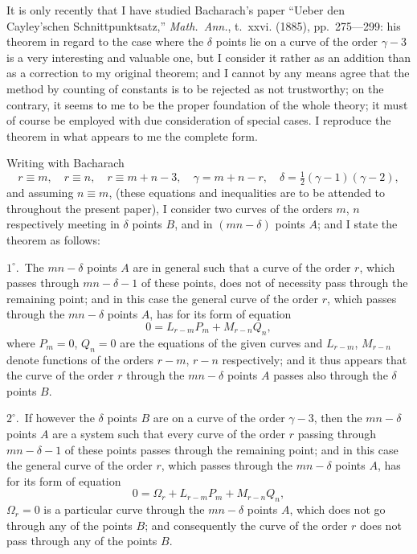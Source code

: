\documentclass[12pt,a4paper]{article}
\theoremstyle{definition}
\begin{document}
It is only recently that I have studied Bacharach's paper ``Ueber den Cayley'schen
Schnittpunktsatz,'' \textit{Math.\ Ann.}, t.~xxvi. (1885), pp.~275---299: his theorem in regard
to the case where the $\delta$ points lie on a curve of the order $\gamma-3$ is a very
interesting and valuable one, but I consider it rather as an addition than as a
correction to my original theorem; and I cannot by any means agree that the
method by counting of constants is to be rejected as not trustworthy; on the
contrary, it seems to me to be the proper foundation of the whole theory; it must
of course be employed with due consideration of special cases. I reproduce the
theorem in what appears to me the complete form.

Writing with Bacharach
\[
r \equiv m, \quad r \equiv n, \quad r \equiv m + n - 3, \quad
\gamma = m + n - r, \quad \delta = \tfrac12(\gamma - 1)(\gamma - 2),
\]
and assuming $n \equiv m$, (these equations and inequalities are to be attended to throughout
the present paper), I consider two curves of the orders $m$, $n$ respectively meeting in
$\delta$ points $B$, and in $(mn - \delta)$ points $A$; and I state the theorem as follows:

$1^\circ$.\ The $mn - \delta$ points $A$ are in general such that a curve of the order $r$,
which passes through $mn - \delta - 1$ of these points, does not of necessity pass through
the remaining point; and in this case the general curve of the order $r$, which passes
through the $mn - \delta$ points $A$, has for its form of equation
\[
0 = L_{r-m} P_m + M_{r-n} Q_n,
\]
where $P_m = 0$, $Q_n = 0$ are the equations of the given curves and $L_{r-m}$, $M_{r-n}$ denote
functions of the orders $r-m$, $r-n$ respectively; and it thus appears that the curve
of the order $r$ through the $mn - \delta$ points $A$ passes also through the $\delta$ points $B$.

$2^\circ$.\ If however the $\delta$ points $B$ are on a curve of the order $\gamma - 3$, then the
$mn - \delta$ points $A$ are a system such that every curve of the order $r$ passing
through $mn - \delta - 1$ of these points passes through the remaining point; and in this
case the general curve of the order $r$, which passes through the $mn - \delta$ points $A$, has
for its form of equation
\[
0 = \Omega_r + L_{r-m} P_m + M_{r-n} Q_n,
\]
$\Omega_r = 0$ is a particular curve through the $mn - \delta$ points $A$, which does not go
through any of the points $B$; and consequently the curve of the order $r$ does not
pass through any of the points $B$.
\end{document}
